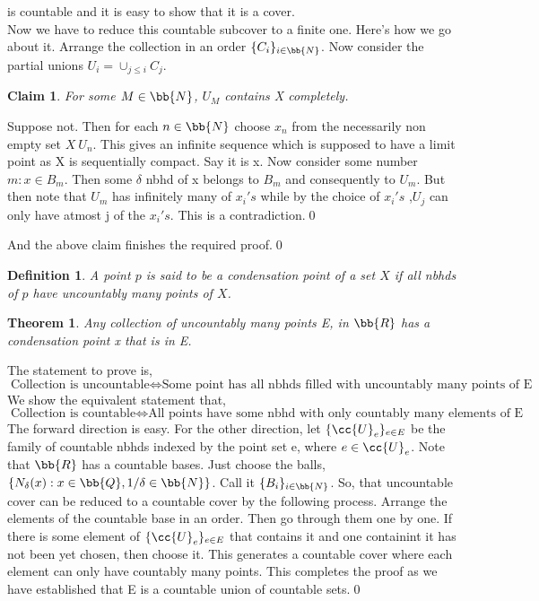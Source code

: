 \documentclass{myclass}
\newtheorem*{definition}{Definition}
\newtheorem*{claim}{Claim}
\newtheorem*{theorem}{Theorem}
\begin{document}
\begin{prf}
    is countable and it is easy to show that it is a cover. \\
    Now we have to reduce this countable subcover to a finite one. Here's how we go about it. Arrange the collection in an order $\{C_i\}_{i\in \bb{N}}$. Now consider the partial unions $U_i=\cup_{j\leq i}C_j$. 
    \begin{claim}
        For some $M\in \bb{N}$, $U_M$ contains X completely.
    \end{claim}
    \begin{subprf}
        Suppose not. Then for each $n\in\bb{N}$ choose $x_n$ from the necessarily non empty set $X\ U_n$. This gives an infinite sequence
        which is supposed to have a limit point as X is sequentially compact. Say it is x. Now consider some number $m:x\in B_m$. Then some $\delta$ nbhd of x belongs to 
        $B_m$ and consequently to $U_m$. But then note that $U_m$ has infinitely many of $x_i's$ while by the choice of $x_i's$ ,$U_j$ can only have atmost j of the $x_i's$.
        This is a contradiction.\qed
    \end{subprf}
    And the above claim finishes the required proof.\qed
\end{prf}

\begin{definition}
    A point $p$ is said to be a condensation point of a set $X$ if all nbhds of $p$ have uncountably many 
    points of $X$.
\end{definition}

\begin{theorem}
    Any collection of uncountably many points E, in $\bb{R}$ has a condensation point x that is in E.
\end{theorem}
\begin{prf}
    The statement to prove is,
    $$\text{Collection is uncountable} \iff \text{Some point has all nbhds filled with uncountably many points of E}$$
    We show the equivalent statement that,
    $$\text{Collection is countable} \iff \text{All points have some nbhd with only countably many elements of E}$$
    The forward direction is easy. For the other direction, let $\{\cc{U}_e\}_{e\in E}$ be the family of countable nbhds indexed by the point set e, where $e\in\cc{U}_e$.
    Note that $\bb{R}$ has a countable bases. Just choose the balls, $\{N_{\delta}(x):x\in\bb{Q},1/\delta\in\bb{N}\}$. Call it $\{B_i\}_{i\in\bb{N}}$.
    So, that uncountable cover can be reduced to a countable cover by the following process. Arrange the elements of the countable base in an order.
    Then go through them one by one. If there is some element of $\{\cc{U}_e\}_{e\in E}$ that contains it and one containint it has not been yet chosen, then choose it. This generates a countable cover 
    where each element can only have countably many points. This completes the proof as we have established that E is a countable union of countable sets.\qed
\end{prf}
\end{document}
